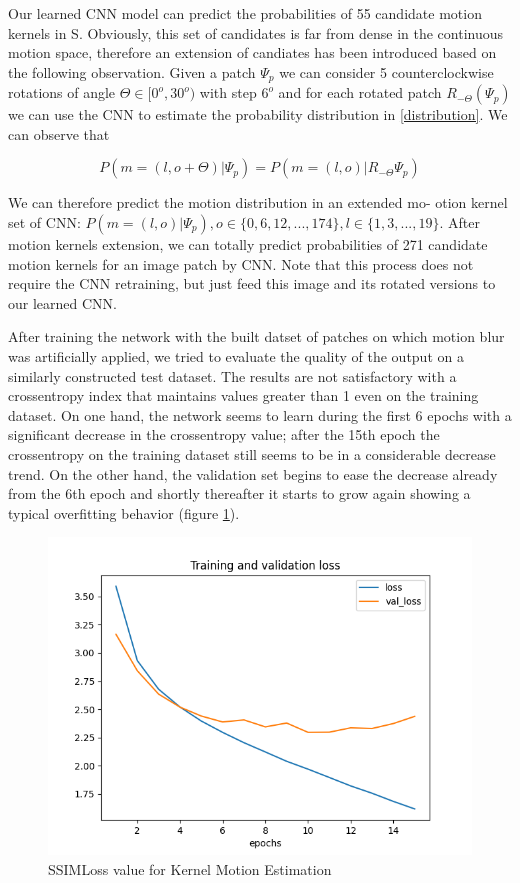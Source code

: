 \documentclass[12pt,a4paper]{report}
\begin{document}
Our learned CNN model can predict the probabilities of 55 candidate motion kernels in S. Obviously, this set of candidates is far from dense in the continuous motion space, therefore an extension of candiates has been introduced based on the following observation. Given a patch $\Psi_p$ we can consider 5 counterclockwise rotations of angle $\Theta \in [0^o, 30^o)$ with step $6^o$ and for each rotated patch $R_{-\Theta}(\Psi_p)$ we can use the CNN to estimate the probability distribution in \ref{distribution}. We can observe that 

\begin{equation}
P(m = (l, o+\Theta)|\Psi_p) = P(m=(l,o)|R_{-\Theta}\Psi_p) 
\end{equation}

We can therefore predict the motion distribution in an extended mo-
otion kernel set of CNN: $P(m = (l, o)|\Psi_p), o \in \lbrace 0, 6, 12, ..., 174 \rbrace, l \in \lbrace 1, 3, ..., 19 \rbrace$.
After motion kernels extension, we can totally predict probabilities of 271 candidate motion kernels for an image patch by CNN. Note that this process does not require the CNN retraining, but just feed this image and its rotated versions to our learned CNN.

After training the network with the built datset of patches on which motion blur was artificially applied, we tried to evaluate the quality of the output on a similarly constructed test dataset. The results are not satisfactory with a crossentropy index that maintains values greater than 1 even on the training dataset. On one hand, the network seems to learn during the first 6 epochs with a significant decrease in the crossentropy value; after the 15th epoch the crossentropy on the training dataset still seems to be in a considerable decrease trend. On the other hand, the validation set begins to ease the decrease already from the 6th epoch and shortly thereafter it starts to grow again showing a typical overfitting behavior (figure \ref{motion_kernel_SSIM}).

\begin{figure}[hptb]
\centering
\includegraphics[scale=0.45]{KernelMotion_loss.png} 
\caption{SSIMLoss value for Kernel Motion Estimation}
\label{motion_kernel_SSIM}
\end{figure}
\end{document}
